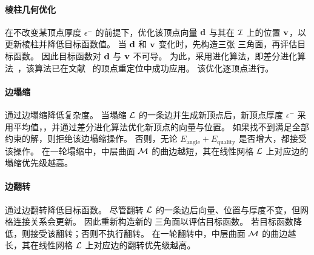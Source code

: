 \paragraph{棱柱几何优化}
在不改变某顶点厚度 $\epsilon^{-}$ 的前提下，优化该顶点向量 $\mathbf{d}$ 与其在 $\mathcal{I}$ 上的位置 $\mathbf{v}$，以更新棱柱并降低目标函数值。
%
当 $\mathbf{d}$ 和 $\mathbf{v}$ 变化时，先构造三张 \Bezier 三角面，再评估目标函数。
%
因此目标函数对 $\mathbf{d}$ 与 $\mathbf{v}$ 不可导。
为此，采用进化算法，即差分进化算法~\cite{Neri2010advance,Das2011Differential}，该算法已在文献~\cite{Zhang2022ConstrainedRU} 的顶点重定位中成功应用。
%
该优化逐顶点进行。

\paragraph{边塌缩}
通过边塌缩降低复杂度。
%
当塌缩 $\mathcal{L}$ 的一条边并生成新顶点后，新顶点厚度 $\epsilon^{-}$ 采用平均值，，并通过差分进化算法优化新顶点的向量与位置。
%
如果找不到满足全部约束的解，则拒绝该边塌缩操作。
否则，无论 $E_{\text{angle}} + E_{\text{quality}}$ 是否增大，都接受该操作。
在一轮塌缩中，中层曲面 $\mathcal{M}$ 的曲边越短，其在线性网格 $\mathcal{L}$ 上对应边的塌缩优先级越高。


\paragraph{边翻转}
通过边翻转降低目标函数。 %
%
尽管翻转 $\mathcal{L}$ 的一条边后向量、位置与厚度不变，但网格连接关系会更新。
因此重新构造新的 \Bezier 三角面以评估目标函数。
若目标函数降低，则接受该翻转；否则不执行翻转。
在一轮翻转中，中层曲面 $\mathcal{M}$ 的曲边越长，其在线性网格 $\mathcal{L}$ 上对应边的翻转优先级越高。


